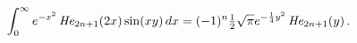 \[\int_{0}^{\infty}e^{-x^{2}}\mathop{\mathit{He}_{2n+1}\/}\nolimits\!\left(2x%
\right)\mathop{\sin\/}\nolimits\!\left(xy\right)dx=(-1)^{n}\tfrac{1}{2}\sqrt{%
\pi}e^{-\frac{1}{4}y^{2}}\mathop{\mathit{He}_{2n+1}\/}\nolimits\!\left(y\right).\]